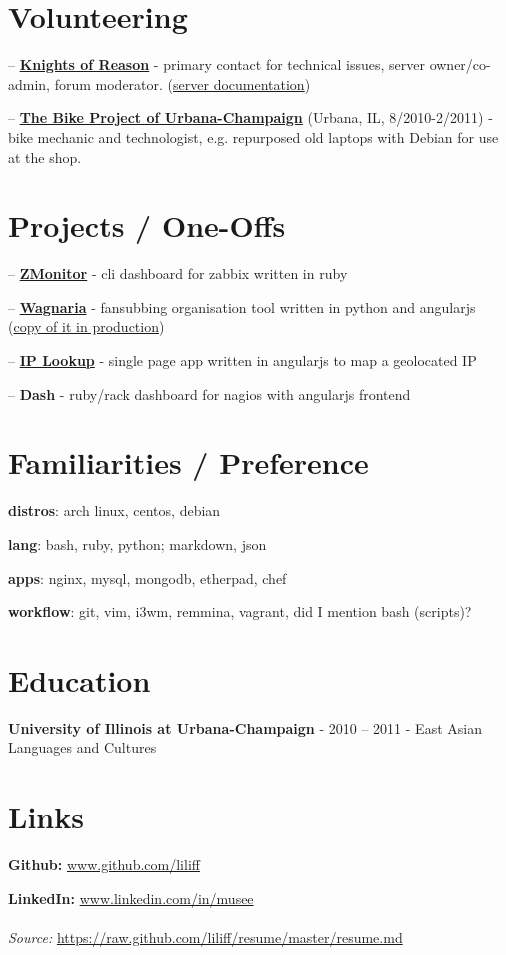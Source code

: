 \documentclass{article}
\begin{document}
\section{Volunteering}

-- \href{http://knightsofreason.net}{\textbf{Knights of Reason}} - primary contact for technical issues, server owner/co-admin, forum moderator. (\href{https://wiki.milkteafuzz.com}{server documentation})\par
-- \href{http://thebikeproject.org}{\textbf{The Bike Project of Urbana-Champaign}} (Urbana, IL, 8/2010-2/2011) - bike mechanic and technologist, e.g. repurposed old laptops with Debian for use at the shop.\par

\section{Projects / One-Offs}

-- \href{https://github.com/liliff/zmonitor}{\textbf{ZMonitor}} - cli dashboard for zabbix written in ruby\par
-- \href{https://github.com/liliff/wagnaria}{\textbf{Wagnaria}} - fansubbing organisation tool written in python and angularjs (\href{https://c.milkteafuzz.com/index.html}{copy of it in production})\par
-- \href{http://ip.milk.tea.jp}{\textbf{IP Lookup}} - single page app written in angularjs to map a geolocated IP\par
-- \textbf{Dash} - ruby/rack dashboard for nagios with angularjs frontend\par

\section{Familiarities / Preference}

\textbf{distros}: arch linux, centos, debian\par
\textbf{lang}: bash, ruby, python; markdown, json\par
\textbf{apps}: nginx, mysql, mongodb, etherpad, chef\par
\textbf{workflow}: git, vim, i3wm, remmina, vagrant, did I mention bash (scripts)?\par

\section{Education}

\textbf{University of Illinois at Urbana-Champaign} - 2010 -- 2011 - East Asian Languages and Cultures
\section{Links}

\textbf{Github:} \url{www.github.com/liliff}\par
\textbf{LinkedIn:} \url{www.linkedin.com/in/musee}
\\
\\
\textsl{Source:} \url{https://raw.github.com/liliff/resume/master/resume.md}
\end{document}

